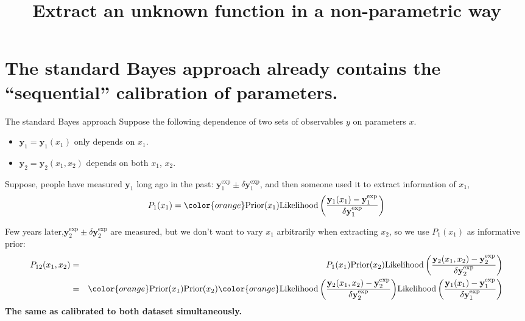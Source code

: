 \documentclass[11pt, aspectratio=1610]{beamer}
\title{Extract an unknown function in a non-parametric way}
\newcommand{\bfy}{\mathbf{y}}
\newcommand{\bfye}{\mathbf{y}^{\textrm{exp}}}
\newcommand{\dbfye}{\delta\mathbf{y}^{\textrm{exp}} }
\newcommand{\like}{ \textrm{Likelihood}}
\newcommand{\prior}{ \textrm{Prior}}
\begin{document}
\begin{frame}
\titlepage
\end{frame}

\begin{frame}
\tableofcontents
\end{frame}
\section{The standard Bayes approach already contains the ``sequential'' calibration of parameters.}
\begin{frame}{The standard Bayes approach}
Suppose the following dependence of two sets of observables $y$ on parameters $x$.
\begin{itemize}
\item $\bfy_1=\bfy_1(x_1)$ only depends on $x_1$.
\item $\bfy_2=\bfy_2(x_1,x_2)$ depends on both $x_1$, $x_2$.
\end{itemize}

Suppose, people have measured $\bfy_1$ long ago in the past: 
$\bfye_1 \pm \dbfye_1$, and then someone used it to extract information of $x_1$,
\begin{eqnarray}
\nonumber
P_1(x_1) = {\color{orange}\prior(x_1)\like\left( \frac{\bfy_1(x_1)-\bfye_1}{\dbfye_1}\right)}
\end{eqnarray}

Few years later,$\bfye_2 \pm \dbfye_2$ are measured, but we don't want to vary $x_1$ arbitrarily when extracting $x_2$, so we use $P_1(x_1)$ as informative prior:
\begin{eqnarray}
\nonumber
P_{12}(x_1, x_2) &=& P_1(x_1)\prior(x_2)\like\left( \frac{\bfy_2(x_1,x_2)-\bfye_2}{\dbfye_2}\right)\\\nonumber
&=& {\color{orange}\prior(x_1)}\prior(x_2){\color{orange}\like\left( \frac{\bfy_2(x_1,x_2)-\bfye_2}{\dbfye_2}\right)}\like\left( \frac{\bfy_1(x_1)-\bfye_1}{\dbfye_1}\right)
\end{eqnarray}
{\bf The same as calibrated to both dataset simultaneously.}
\end{frame}
\end{document}
